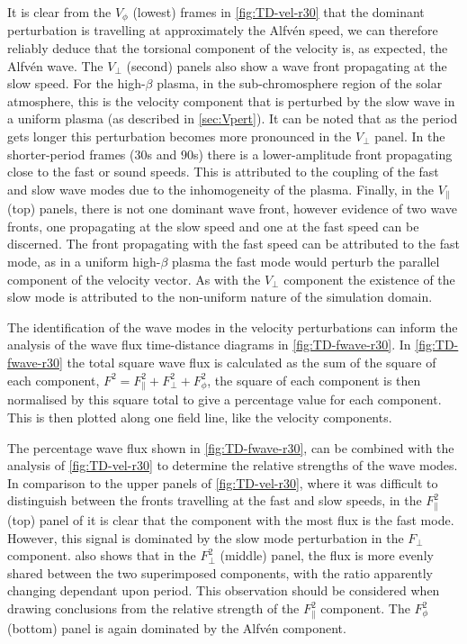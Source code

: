 It is clear from the $V_\phi$ (lowest) frames in \cref{fig:TD-vel-r30} that the dominant perturbation is travelling at approximately the Alfv\'en speed, we can therefore reliably deduce that the torsional component of the velocity is, as expected, the Alfv\'en wave.
The $V_\perp$ (second) panels also show a wave front propagating at the slow speed. For the high-$\beta$ plasma, in the sub-chromosphere region of the solar atmosphere, this is the velocity component that is perturbed by the slow wave in a uniform plasma (as described in \cref{sec:Vpert}).
It can be noted that as the period gets longer this perturbation becomes more pronounced in the $V_\perp$ panel.
In the shorter-period frames ($30$s and $90$s) there is a lower-amplitude front propagating close to the fast or sound speeds.
This is attributed to the coupling of the fast and slow wave modes due to the inhomogeneity of the plasma.
Finally, in the $V_\parallel$ (top) panels, there is not one dominant wave front, however evidence of two wave fronts, one propagating at the slow speed and one at the fast speed can be discerned.
The front propagating with the fast speed can be attributed to the fast mode, as in a uniform high-$\beta$ plasma the fast mode would perturb the parallel component of the velocity vector.
As with the $V_\perp$ component the existence of the slow mode is attributed to the non-uniform nature of the simulation domain.


The identification of the wave modes in the velocity perturbations can inform the analysis of the wave flux time-distance diagrams in \cref{fig:TD-fwave-r30}.
In \cref{fig:TD-fwave-r30} the total square wave flux is calculated as the sum of the square of each component, $ F^2 = F_\parallel^2 + F_\perp ^2  + F_\phi^2$, the square of each component is then normalised by this square total to give a percentage value for each component.
This is then plotted along one field line, like the velocity components.


The percentage wave flux shown in \cref{fig:TD-fwave-r30}, can be combined with the analysis of \cref{fig:TD-vel-r30} to determine the relative strengths of the wave modes.
In comparison to the upper panels of \cref{fig:TD-vel-r30}, where it was difficult to distinguish between the fronts travelling at the fast and slow speeds, in the $F^2_\parallel$ (top) panel of  it is clear that the component with the most flux is the fast mode.
However, this signal is dominated by the slow mode perturbation in the $F_\perp$ component.
 also shows that in the $F^2_\perp$ (middle) panel, the flux is more evenly shared between the two superimposed components, with the ratio apparently changing dependant upon period.
This observation should be considered when drawing conclusions from the relative strength of the $F^2_\parallel$ component.
The $F^2_\phi$ (bottom) panel is again dominated by the Alfv\'en component.

